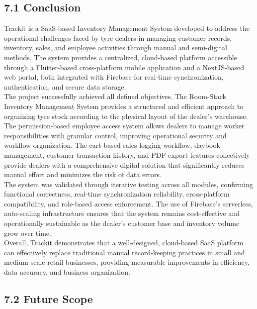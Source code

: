 \documentclass[12pt, oneside]{article}
\begin{document}
\subsection*{7.1 Conclusion}

Trackit is a SaaS-based Inventory Management System developed to address the operational
challenges faced by tyre dealers in managing customer records, inventory, sales, and employee
activities through manual and semi-digital methods. The system provides a centralized,
cloud-based platform accessible through a Flutter-based cross-platform mobile application
and a NextJS-based web portal, both integrated with Firebase for real-time synchronization,
authentication, and secure data storage.\\[0.25cm]
The project successfully achieved all defined objectives. The Room-Stack Inventory Management
System provides a structured and efficient approach to organizing tyre stock according to
the physical layout of the dealer's warehouse. The permission-based employee access system
allows dealers to manage worker responsibilities with granular control, improving operational
security and workflow organization. The cart-based sales logging workflow, daybook management,
customer transaction history, and PDF export features collectively provide dealers with a
comprehensive digital solution that significantly reduces manual effort and minimizes the
risk of data errors.\\[0.25cm]
The system was validated through iterative testing across all modules, confirming functional
correctness, real-time synchronization reliability, cross-platform compatibility, and
role-based access enforcement. The use of Firebase's serverless, auto-scaling infrastructure
ensures that the system remains cost-effective and operationally sustainable as the dealer's
customer base and inventory volume grow over time.\\[0.25cm]
Overall, Trackit demonstrates that a well-designed, cloud-based SaaS platform can effectively
replace traditional manual record-keeping practices in small and medium-scale retail businesses,
providing measurable improvements in efficiency, data accuracy, and business organization.


\subsection*{7.2 Future Scope}
\end{document}

